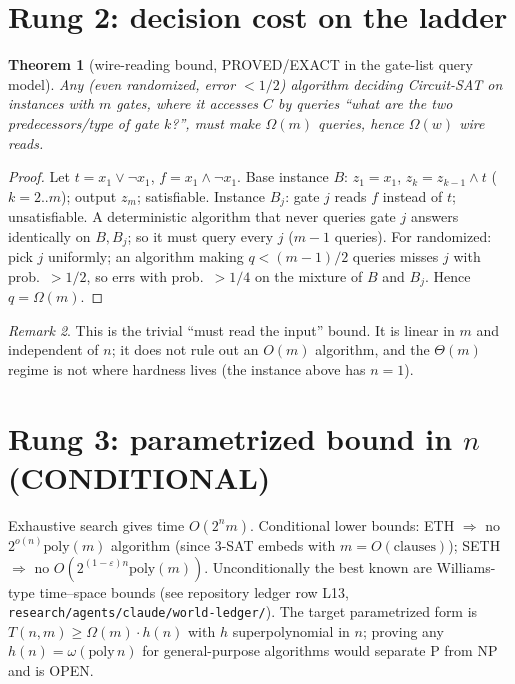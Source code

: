 \documentclass[11pt]{article}
\newtheorem{theorem}{Theorem}\newtheorem{lemma}[theorem]{Lemma}
\theoremstyle{remark}\newtheorem{remark}[theorem]{Remark}
\begin{document}
\section{Rung 2: decision cost on the ladder}
\begin{theorem}[wire-reading bound, PROVED/EXACT in the gate-list query model]
Any (even randomized, error $<1/2$) algorithm deciding Circuit-SAT on instances with $m$ gates, where it accesses $C$ by queries ``what are the two predecessors/type of gate $k$?'', must make $\Omega(m)$ queries, hence $\Omega(w)$ wire reads.\end{theorem}
\begin{proof} Let $t=x_1\vee\neg x_1$, $f=x_1\wedge\neg x_1$. Base instance $B$: $z_1=x_1$, $z_{k}=z_{k-1}\wedge t$ ($k=2..m$); output $z_m$; satisfiable. Instance $B_j$: gate $j$ reads $f$ instead of $t$; unsatisfiable. A deterministic algorithm that never queries gate $j$ answers identically on $B,B_j$; so it must query every $j$ ($m-1$ queries). For randomized: pick $j$ uniformly; an algorithm making $q<(m-1)/2$ queries misses $j$ with prob.\ $>1/2$, so errs with prob.\ $>1/4$ on the mixture of $B$ and $B_j$. Hence $q=\Omega(m)$.\end{proof}
\begin{remark} This is the trivial ``must read the input'' bound. It is linear in $m$ and independent of $n$; it does not rule out an $O(m)$ algorithm, and the $\Theta(m)$ regime is not where hardness lives (the instance above has $n=1$).\end{remark}

\section{Rung 3: parametrized bound in $n$ (CONDITIONAL)}
Exhaustive search gives time $O(2^n m)$. Conditional lower bounds: ETH $\Rightarrow$ no $2^{o(n)}\mathrm{poly}(m)$ algorithm (since 3-SAT embeds with $m=O(\text{clauses})$); SETH $\Rightarrow$ no $O(2^{(1-\varepsilon)n}\mathrm{poly}(m))$. Unconditionally the best known are Williams-type time--space bounds (see repository ledger row L13, \texttt{research/agents/claude/world-ledger/}). The target parametrized form is $T(n,m)\ge \Omega(m)\cdot h(n)$ with $h$ superpolynomial in $n$; proving any $h(n)=\omega(\mathrm{poly}\,n)$ for general-purpose algorithms would separate P from NP and is OPEN.
\end{document}
